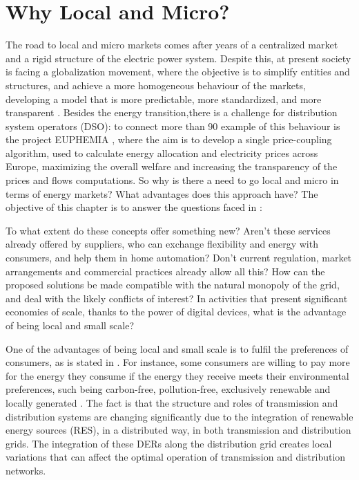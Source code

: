 \section{Why Local and Micro?} \label{sec:why}
The road to local and micro markets comes after years of a centralized market and a rigid structure of the electric power system. Despite this, at present society is facing a globalization movement, where the objective is to simplify entities and structures, and achieve a more homogeneous behaviour of the markets, developing a model that is more predictable, more standardized, and more transparent \cite{Mallet2014}. Besides the energy transition,there is a challenge for distribution system operators (DSO): to connect more than 90%
example of this behaviour is the project EUPHEMIA \cite{EUPHEMIA2016}, where the aim is to develop a single price-coupling algorithm, used to calculate energy allocation and electricity prices across Europe, maximizing the overall welfare and increasing the transparency of the prices and flows computations. So why is there a need to go local and micro in terms of energy markets? What advantages does this approach have? The objective of this chapter is to answer the questions faced in \cite{DesignElectricityMarketRossetoo2017}:

\begin{tcolorbox}
To what extent do these concepts offer something new? Aren't these services already offered by suppliers, who can exchange flexibility and energy with consumers, and help them in home automation? Don't current regulation, market arrangements and commercial
practices already allow all this? How can the proposed solutions be made compatible with the natural monopoly of the grid, and deal with the likely conflicts of interest? In activities that present significant economies of scale, thanks to the power of digital devices, what is the advantage of being local and small scale?
\end{tcolorbox}

One of the advantages of being local and small scale is to fulfil the preferences of consumers, as is stated in \cite{faber2014micro}. For instance, some consumers are willing to pay more for the energy they consume if the energy they receive meets their environmental preferences, such being carbon-free, pollution-free, exclusively renewable and locally generated \cite{lane2013costing}. The fact is that the structure and roles of transmission and distribution systems are changing significantly due to the integration of renewable energy sources (RES), in a distributed way, in both transmission and distribution grids. The integration of these DERs along the distribution grid creates local variations that can affect the optimal operation of transmission and distribution networks.

